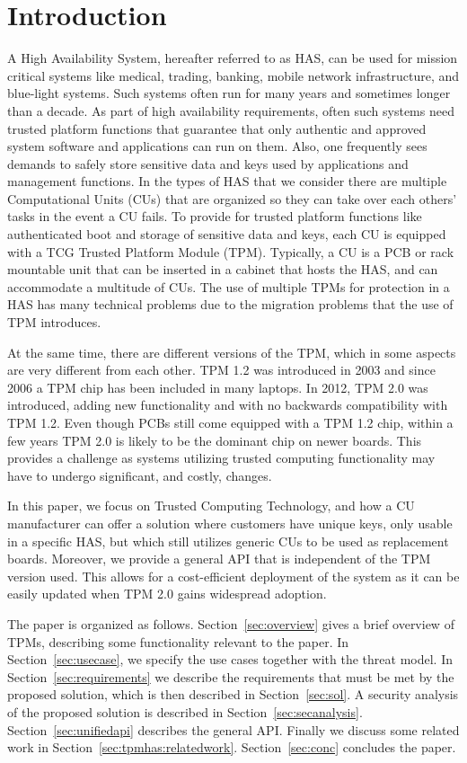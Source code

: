 {\section{Introduction}
A High Availability System, hereafter referred to as HAS, can be used for mission critical systems like medical, trading, banking, mobile network infrastructure, and blue-light systems. Such systems often run for many years and sometimes longer than a decade.  As part of high availability requirements, often such systems need trusted platform functions that guarantee that only authentic and approved system software and applications can run on them. Also, one frequently sees demands to safely store sensitive data and keys used by applications and management functions.
In the types of HAS that we consider there are multiple Computational Units (CUs) that are organized so they can take over each others' tasks in the event a CU fails. To provide for trusted platform functions like authenticated boot and storage of sensitive data and keys, each CU is equipped with a TCG Trusted Platform Module (TPM). Typically, a CU is a PCB or rack mountable unit that can be inserted in a cabinet that hosts the HAS, and can accommodate a multitude of CUs. The use of multiple TPMs for protection in a HAS has many technical problems due to the migration problems that the use of TPM introduces.
 
At the same time, there are different versions of the TPM, which in some aspects are very different from each other. TPM 1.2 was introduced in 2003 and since 2006 a TPM chip has been included in many laptops. In 2012, TPM 2.0 was introduced, adding new functionality and with no backwards compatibility with TPM 1.2. Even though PCBs still come equipped with a TPM 1.2 chip, within a few years TPM 2.0 is likely to be the dominant chip on newer boards. This provides a challenge as systems utilizing trusted computing functionality may have to undergo significant, and costly, changes.
 
In this paper, we focus on Trusted Computing Technology, and how a CU manufacturer can offer a solution where customers have unique keys, only usable in a specific HAS, but which still utilizes generic CUs to be used as replacement boards. Moreover, we provide a general API that is independent of the TPM version used. This allows for a cost-efficient deployment of the system as it can be easily updated when TPM 2.0 gains widespread adoption.

The paper is organized as follows. Section~\ref{sec:overview} gives a brief overview of TPMs, describing some functionality relevant to the paper. In Section~\ref{sec:usecase}, we specify the use cases together with the threat model. In Section~\ref{sec:requirements} we describe the requirements that must be met by the proposed solution, which is then described in Section~\ref{sec:sol}. A security analysis of the proposed solution is described in Section~\ref{sec:secanalysis}. Section~\ref{sec:unifiedapi} describes the general API. Finally we discuss some related work in Section~\ref{sec:tpmhas:relatedwork}. Section~\ref{sec:conc} concludes the paper.
 
}
